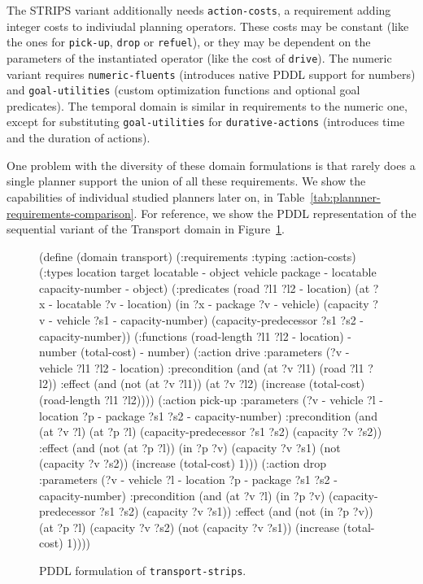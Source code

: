 The STRIPS variant additionally needs \verb+action-costs+, a requirement adding
integer costs to indiviudal planning operators. These costs may be constant
(like the ones for \verb+pick-up+, \verb+drop+ or \verb+refuel+),
or they may be dependent on the parameters of the instantiated operator (like
the cost of \verb+drive+).
The numeric variant
requires \verb+numeric-fluents+ (introduces native PDDL support for numbers) and
\verb+goal-utilities+ (custom optimization functions and optional goal predicates).
The temporal domain is similar in requirements to the numeric one, except for
substituting \verb+goal-utilities+ for \verb+durative-actions+ (introduces time
and the duration of actions).

One problem with the diversity of these domain formulations is that rarely does
a single planner support the union of all these requirements.
We show the capabilities of individual studied planners
later on, in Table~\ref{tab:plannner-requirements-comparison}.
For reference, we show the PDDL representation of the sequential variant of
the Transport domain in Figure~\ref{code:pddl-strips}.

\begin{figure}[tb]
\begin{code}
(define (domain transport)
  (:requirements :typing :action-costs)
  (:types
        location target locatable - object
        vehicle package - locatable
        capacity-number - object)
  (:predicates 
     (road ?l1 ?l2 - location)
     (at ?x - locatable ?v - location)
     (in ?x - package ?v - vehicle)
     (capacity ?v - vehicle ?s1 - capacity-number)
     (capacity-predecessor ?s1 ?s2 - capacity-number))
  (:functions
     (road-length ?l1 ?l2 - location) - number
     (total-cost) - number)     
  (:action drive
    :parameters (?v - vehicle ?l1 ?l2 - location)
    :precondition (and (at ?v ?l1) (road ?l1 ?l2))
    :effect (and (not (at ?v ?l1)) (at ?v ?l2)
        (increase (total-cost) (road-length ?l1 ?l2))))        
 (:action pick-up
    :parameters (?v - vehicle ?l - location ?p - package
                 ?s1 ?s2 - capacity-number)
    :precondition (and (at ?v ?l) (at ?p ?l)
        (capacity-predecessor ?s1 ?s2) (capacity ?v ?s2))
    :effect (and (not (at ?p ?l)) (in ?p ?v) (capacity ?v ?s1)
        (not (capacity ?v ?s2)) (increase (total-cost) 1)))
  (:action drop
    :parameters (?v - vehicle ?l - location ?p - package
                 ?s1 ?s2 - capacity-number)
    :precondition (and (at ?v ?l) (in ?p ?v)
        (capacity-predecessor ?s1 ?s2) (capacity ?v ?s1))
    :effect (and (not (in ?p ?v)) (at ?p ?l) (capacity ?v ?s2)
        (not (capacity ?v ?s1)) (increase (total-cost) 1))))
\end{code}
\caption{PDDL formulation of \texttt{transport-strips}.}
\label{code:pddl-strips}
\end{figure}


